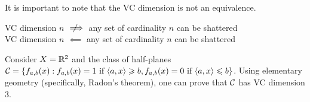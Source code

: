 It is important to note that the VC dimension is not an equivalence.
    \begin{center}
        VC dimension $n$ $\notimplies$ any set of cardinality $n$ can be shattered \\
        VC dimension $n$ $\impliedby$ any set of cardinality $n$ can be shattered
    \end{center}


\begin{example}[Intermediate]
    Consider $X=\mathbb{R}^2$ and the class of half-planes $\mathcal{C} = \{f_{a,b}(x) : f_{a,b}(x) = 1 \text{ if } \langle a,x \rangle \geqslant b, f_{a,b}(x) = 0 \text{ if } \langle a, x \rangle \leqslant b \}$. Using elementary geometry (specifically, Radon's theorem), one can prove that $\mathcal{C}$ has VC dimension 3.
\end{example}

